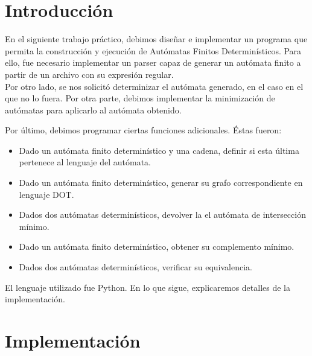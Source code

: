 \documentclass[a4paper, 10pt, twoside]{article}
\begin{document}
\newpage

\tableofcontents

\newpage



\section{Introducción}
En el siguiente trabajo práctico, debimos diseñar e implementar un programa que permita la construcción y ejecución de Autómatas Finitos Determinísticos. Para ello, fue necesario implementar un parser capaz de generar un autómata finito a partir de un archivo con su expresión regular.\\
Por otro lado, se nos solicitó determinizar el autómata generado, en el caso en el que no lo fuera. Por otra parte, debimos implementar la minimización de autómatas para aplicarlo al autómata obtenido.

Por último, debimos programar ciertas funciones adicionales. Éstas fueron:
\begin{itemize}
\item Dado un autómata finito determinístico y una cadena, definir si esta última pertenece al lenguaje del autómata.
\item Dado un autómata finito determinístico, generar su grafo correspondiente en lenguaje DOT.
\item Dados dos autómatas determinísticos, devolver la el autómata de intersección mínimo.
\item Dado un autómata finito determinístico, obtener su complemento mínimo.
\item Dados dos autómatas determinísticos, verificar su equivalencia.
\end{itemize} 

El lenguaje utilizado fue Python.
En lo que sigue, explicaremos detalles de la implementación.
\newpage
\section{Implementación}
\end{document}

